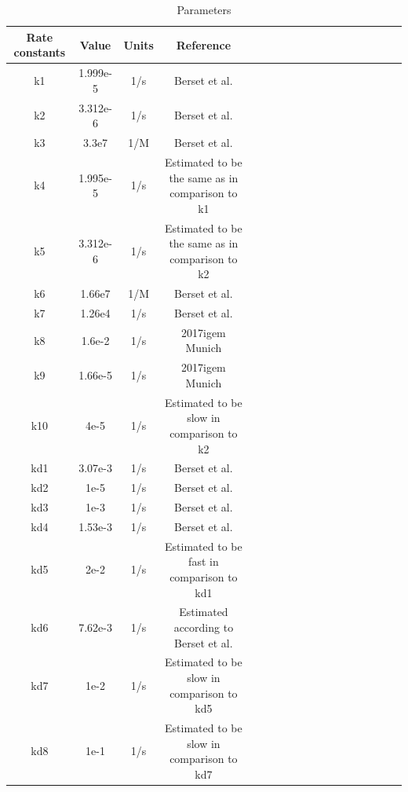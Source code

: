 \\\\
\begin{table}[htbp]
	\centering
	\caption{\label {tab:test} Parameters}
	\begin{tabular}{cccccccccccccccccc}
		\toprule
		Rate constants & Value& Units & Reference\\
		\midrule
		k1 & 1.999e-5 &1/s & Berset et al. \\
	k2 & 3.312e-6 &1/s & Berset et al.\\
	k3 & 3.3e7    & 1/M &Berset et al.   \\
	k4 &1.995e-5 &1/s & Estimated to be the same as in comparison to k1\\
	k5 & 3.312e-6 &1/s&Estimated to be the same as in comparison to k2\\
	k6 &1.66e7   &1/M & Berset et al.  \\
	k7  &1.26e4 &1/s & Berset et al. \\
	k8&1.6e-2& 1/s & 2017igem Munich\\
	k9 &1.66e-5&1/s&  2017igem Munich\\ 
	k10&4e-5&1/s & Estimated to be slow in comparison to k2 \\
	kd1 & 3.07e-3&1/s & Berset et al.\\
	kd2&1e-5&1/s & Berset et al.\\
	kd3&1e-3&1/s  & Berset et al.\\
	kd4&1.53e-3&1/s  & Berset et al.\\
	kd5 & 2e-2&1/s & Estimated to be fast in comparison to kd1\\
	kd6&7.62e-3&1/s&  Estimated according to Berset et al.\\
	kd7& 1e-2&1/s&  Estimated to be slow in comparison to kd5\\
	kd8&1e-1&1/s&  Estimated to be slow in comparison to kd7\\			
		\bottomrule
	\end{tabular}
\end{table}



